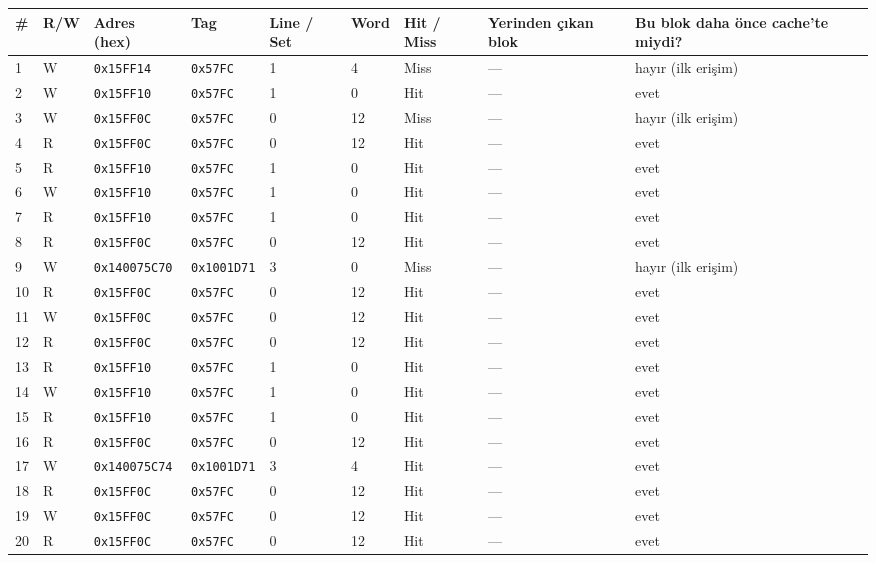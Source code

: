 \documentclass[11pt,a4paper]{article}
\newcommand{\tl}{\texttt}
\newcommand{\hd}[1]{\cellcolor{hdr}#1}
\begin{document}
{\small
\begin{longtable}{|p{0.5cm}|p{0.6cm}|p{2.2cm}|p{1.8cm}|p{0.9cm}|p{0.9cm}|p{1.0cm}|p{1.6cm}|p{3.2cm}|}
\hline
\hd{\#} & \hd{R/W} & \hd{Adres (hex)} & \hd{Tag} & \hd{Line / Set} & \hd{Word} & \hd{Hit / Miss} & \hd{Yerinden çıkan blok} & \hd{Bu blok daha önce cache'te miydi?}\\
\hline
\endhead
1 & W & \tl{0x15FF14} & \tl{0x57FC} & 1 & 4 & Miss & --- & hayır (ilk erişim)\\
\hline
2 & W & \tl{0x15FF10} & \tl{0x57FC} & 1 & 0 & Hit & --- & evet\\
\hline
3 & W & \tl{0x15FF0C} & \tl{0x57FC} & 0 & 12 & Miss & --- & hayır (ilk erişim)\\
\hline
4 & R & \tl{0x15FF0C} & \tl{0x57FC} & 0 & 12 & Hit & --- & evet\\
\hline
5 & R & \tl{0x15FF10} & \tl{0x57FC} & 1 & 0 & Hit & --- & evet\\
\hline
6 & W & \tl{0x15FF10} & \tl{0x57FC} & 1 & 0 & Hit & --- & evet\\
\hline
7 & R & \tl{0x15FF10} & \tl{0x57FC} & 1 & 0 & Hit & --- & evet\\
\hline
8 & R & \tl{0x15FF0C} & \tl{0x57FC} & 0 & 12 & Hit & --- & evet\\
\hline
9 & W & \tl{0x140075C70} & \tl{0x1001D71} & 3 & 0 & Miss & --- & hayır (ilk erişim)\\
\hline
10 & R & \tl{0x15FF0C} & \tl{0x57FC} & 0 & 12 & Hit & --- & evet\\
\hline
11 & W & \tl{0x15FF0C} & \tl{0x57FC} & 0 & 12 & Hit & --- & evet\\
\hline
12 & R & \tl{0x15FF0C} & \tl{0x57FC} & 0 & 12 & Hit & --- & evet\\
\hline
13 & R & \tl{0x15FF10} & \tl{0x57FC} & 1 & 0 & Hit & --- & evet\\
\hline
14 & W & \tl{0x15FF10} & \tl{0x57FC} & 1 & 0 & Hit & --- & evet\\
\hline
15 & R & \tl{0x15FF10} & \tl{0x57FC} & 1 & 0 & Hit & --- & evet\\
\hline
16 & R & \tl{0x15FF0C} & \tl{0x57FC} & 0 & 12 & Hit & --- & evet\\
\hline
17 & W & \tl{0x140075C74} & \tl{0x1001D71} & 3 & 4 & Hit & --- & evet\\
\hline
18 & R & \tl{0x15FF0C} & \tl{0x57FC} & 0 & 12 & Hit & --- & evet\\
\hline
19 & W & \tl{0x15FF0C} & \tl{0x57FC} & 0 & 12 & Hit & --- & evet\\
\hline
20 & R & \tl{0x15FF0C} & \tl{0x57FC} & 0 & 12 & Hit & --- & evet\\

\end{longtable}}
\end{document}

